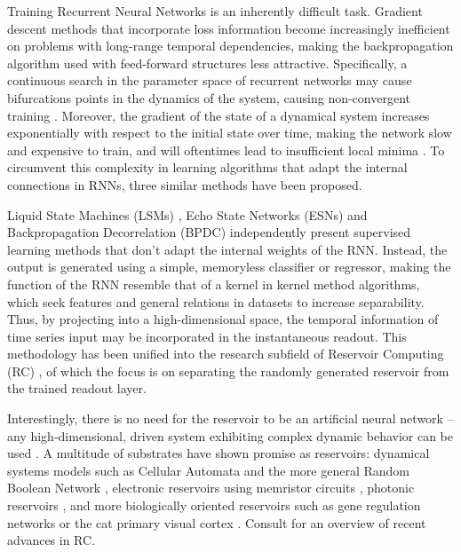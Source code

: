 Training Recurrent Neural Networks is an inherently difficult task. Gradient
descent methods that incorporate loss information become increasingly
inefficient on problems with long-range temporal dependencies, making the
backpropagation algorithm used with feed-forward structures less
attractive. Specifically, a continuous search in the parameter space of
recurrent networks may cause bifurcations points in the dynamics of the system,
causing non-convergent training \cite{doya_bifurcations_nodate}. Moreover, the
gradient of the state of a dynamical system increases exponentially with respect
to the initial state over time, making the network slow and expensive to train,
and will oftentimes lead to insufficient local minima
\cite{bengio_learning_1994}. To circumvent this complexity in learning
algorithms that adapt the internal connections in RNNs, three similar methods
have been proposed.

Liquid State Machines (LSMs) \cite{maass_real-time_2002}, Echo State Networks
(ESNs) \cite{jaeger_echo_2001} and Backpropagation Decorrelation (BPDC)
\cite{steil_backpropagation-decorrelation:_2004} independently present
supervised learning methods that don't adapt the internal weights of the
RNN. Instead, the output is generated using a simple, memoryless classifier or
regressor, making the function of the RNN resemble that of a kernel in kernel
method algorithms, which seek features and general relations in datasets to
increase separability. Thus, by projecting into a high-dimensional space, the
temporal information of time series input may be incorporated in the
instantaneous readout. This methodology has been unified into the research
subfield of Reservoir Computing (RC) \cite{schrauwen_overview_2007}, of which
the focus is on separating the randomly generated reservoir from the trained
readout layer.

Interestingly, there is no need for the reservoir to be an artificial neural
network -- any high-dimensional, driven system exhibiting complex dynamic
behavior can be used \cite{schrauwen_overview_2007}. A multitude of substrates
have shown promise as reservoirs: dynamical systems models such as Cellular
Automata \cite{nichele_deep_2017} and the more general Random Boolean Network
\cite{snyder_computational_2013}, electronic reservoirs using memristor circuits
\cite{kulkarni_memristor-based_2012}, photonic reservoirs
\cite{vandoorne_experimental_2014}, and more biologically oriented reservoirs
such as gene regulation networks \cite{jones_is_2007} or the cat primary visual
cortex \cite{scholkopf_temporal_2007}. Consult \cite{tanaka_recent_2018} for an
overview of recent advances in RC.

